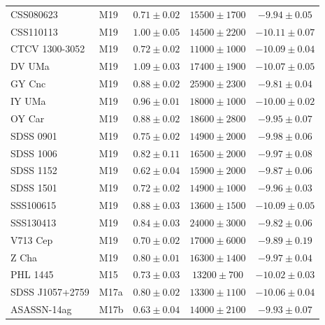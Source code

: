 \begin{table}
\begin{tabular}{llccc}
        CSS080623        &  M19  & $0.71 \pm 0.02$ & $15500\pm  1700$ & $ -9.94 \pm 0.05$ \\
        CSS110113        &  M19  & $1.00 \pm 0.05$ & $14500\pm  2200$ & $-10.11 \pm 0.07$ \\
        CTCV 1300-3052   &  M19  & $0.72 \pm 0.02$ & $11000\pm  1000$ & $-10.09 \pm 0.04$ \\
        DV UMa           &  M19  & $1.09 \pm 0.03$ & $17400\pm  1900$ & $-10.07 \pm 0.05$ \\
        GY Cnc           &  M19  & $0.88 \pm 0.02$ & $25900\pm  2300$ & $ -9.81 \pm 0.04$ \\
        IY UMa           &  M19  & $0.96 \pm 0.01$ & $18000\pm  1000$ & $-10.00 \pm 0.02$ \\
        OY Car           &  M19  & $0.88 \pm 0.02$ & $18600\pm  2800$ & $ -9.95 \pm 0.07$ \\
        SDSS 0901        &  M19  & $0.75 \pm 0.02$ & $14900\pm  2000$ & $ -9.98 \pm 0.06$ \\
        SDSS 1006        &  M19  & $0.82 \pm 0.11$ & $16500\pm  2000$ & $ -9.97 \pm 0.08$ \\
        SDSS 1152        &  M19  & $0.62 \pm 0.04$ & $15900\pm  2000$ & $ -9.87 \pm 0.06$ \\
        SDSS 1501        &  M19  & $0.72 \pm 0.02$ & $14900\pm  1000$ & $ -9.96 \pm 0.03$ \\
        SSS100615        &  M19  & $0.88 \pm 0.03$ & $13600\pm  1500$ & $-10.09 \pm 0.05$ \\
        SSS130413        &  M19  & $0.84 \pm 0.03$ & $24000\pm  3000$ & $ -9.82 \pm 0.06$ \\
        V713 Cep         &  M19  & $0.70 \pm 0.02$ & $17000\pm  6000$ & $ -9.89 \pm 0.19$ \\
        Z Cha            &  M19  & $0.80 \pm 0.01$ & $16300\pm  1400$ & $ -9.97 \pm 0.04$ \\
        PHL 1445         &  M15  & $0.73 \pm 0.03$ & $13200\pm   700$ & $-10.02 \pm 0.03$ \\
        SDSS J1057+2759  &  M17a & $0.80 \pm 0.02$ & $13300\pm  1100$ & $-10.06 \pm 0.04$ \\
        ASASSN-14ag      &  M17b & $0.63 \pm 0.04$ & $14000\pm  2100$ & $ -9.93 \pm 0.07$ \\
        \hline
    \end{tabular}
\end{table}

